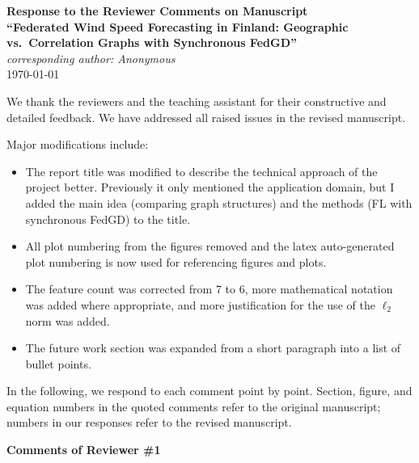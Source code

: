 \documentclass[11pt,onecolumn]{IEEEtran}
\begin{document}
\begin{center}
      {\bf\Large Response to the Reviewer Comments on Manuscript}\\[2mm]
      {\bf\Large ``Federated Wind Speed Forecasting in Finland: Geographic vs.\ Correlation Graphs with Synchronous FedGD''}\\[7mm]
      {\em\large corresponding author: Anonymous}\\[6.0mm]
      \today
\end{center}

\vspace{7mm}

We thank the reviewers and the teaching assistant for their constructive and detailed feedback.
We have addressed all raised issues in the revised manuscript.
\vspace{2mm}

Major modifications include:

\vspace{2mm}

\begin{itemize}
      \item The report title was modified to describe the technical approach of the project better. Previously it only mentioned the application domain, but I added the main idea (comparing graph structures) and the methods (FL with synchronous FedGD) to the title.
      \item All plot numbering from the figures removed and the latex auto-generated plot numbering is now used for referencing figures and plots.
      \item The feature count was corrected from 7 to 6, more mathematical notation was added where appropriate, and more justification for the use of the $\ell_2$ norm was added.
      \item The future work section was expanded from a short paragraph into a list of bullet points.
\end{itemize}

In the following, we respond to each comment point by point.
Section, figure, and equation numbers in the quoted comments refer to the original manuscript;
numbers in our responses refer to the revised manuscript.

\vspace{5mm}


\begin{center}
      {\bf\large Comments of Reviewer \#1}
      \vspace{1mm}
\end{center}
\end{document}
